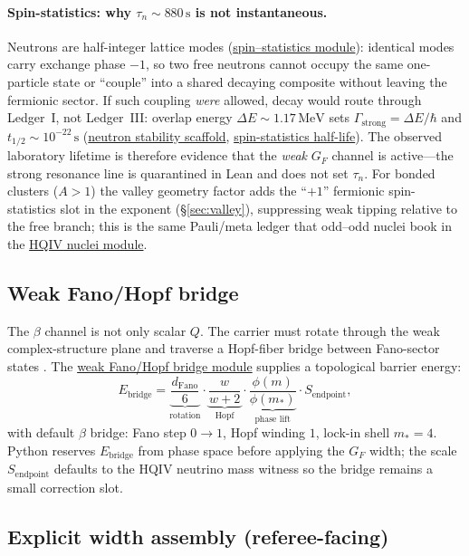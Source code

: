 \documentclass[11pt,notitlepage]{amsart}
\begin{document}
\paragraph{Spin-statistics: why $\tau_n\sim 880\,\mathrm{s}$ is not instantaneous.}
Neutrons are half-integer lattice modes
(\hyperref[lean:spin-stats]{spin--statistics module}): identical modes carry exchange
phase $-1$, so two free neutrons cannot occupy the same one-particle state or
``couple'' into a shared decaying composite without leaving the fermionic sector.
If such coupling \emph{were} allowed, decay would route through Ledger~I, not
Ledger~III: overlap energy $\Delta E\sim 1.17\,\mathrm{MeV}$ sets
$\Gamma_{\mathrm{strong}}=\Delta E/\hbar$ and
$t_{1/2}\sim 10^{-22}\,\mathrm{s}$
(\hyperref[lean:neutron-scaffold]{neutron stability scaffold},
\hyperref[lean:spin-stats-half-life]{spin-statistics half-life}).
The observed laboratory lifetime is therefore evidence that the \emph{weak}
$G_F$ channel is active---the strong resonance line is quarantined in Lean and
does not set $\tau_n$. For bonded clusters ($A>1$) the valley geometry factor
adds the ``$+1$'' fermionic spin-statistics slot in the exponent
(\S\ref{sec:valley}), suppressing weak tipping relative to the free branch; this
is the same Pauli/meta ledger that odd--odd nuclei book in the \hyperref[lean:hqiv-nuclei]{HQIV nuclei module}.

\subsection{Weak Fano/Hopf bridge}
\label{sec:fano-hopf}

The $\beta$ channel is not only scalar $Q$. The carrier must rotate through the weak
complex-structure plane and traverse a Hopf-fiber bridge between Fano-sector states
\cite{hqiv-tuft-sm-lagrangian-paper}. The
\hyperref[lean:weak-fano-hopf]{weak Fano/Hopf bridge module} supplies a topological
barrier energy:
\[
  E_{\mathrm{bridge}} = \underbrace{\frac{d_{\mathrm{Fano}}}{6}}_{\text{rotation}}
    \cdot \underbrace{\frac{w}{w+2}}_{\text{Hopf}}
    \cdot \underbrace{\frac{\phi(m)}{\phi(m_\ast)}}_{\text{phase lift}}
    \cdot S_{\mathrm{endpoint}},
\]
with default $\beta$ bridge: Fano step $0\to 1$, Hopf winding $1$, lock-in shell
$m_\ast=4$. Python reserves $E_{\mathrm{bridge}}$ from phase space before applying
the $G_F$ width; the scale $S_{\mathrm{endpoint}}$ defaults to the HQIV neutrino
mass witness so the bridge remains a small correction slot.

\subsection{Explicit width assembly (referee-facing)}
\label{sec:width-assembly}
\end{document}
